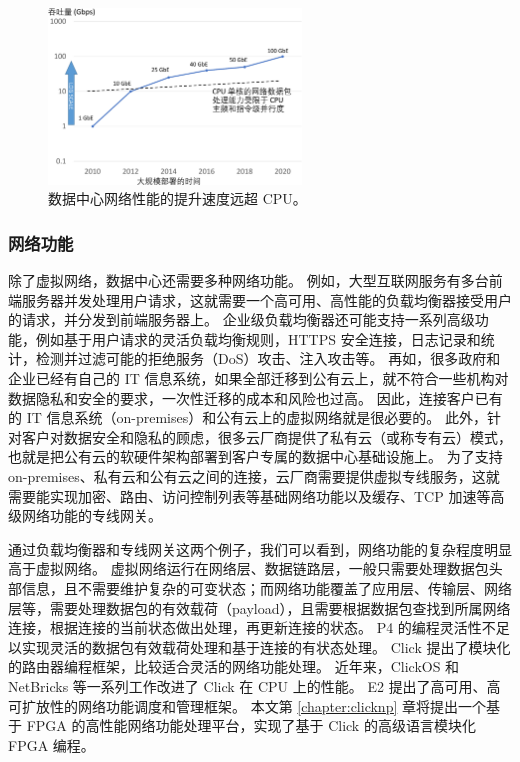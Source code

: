 \begin{figure}[htbp]
	\centering
	\includegraphics[width=0.6\textwidth]{figures/network_perf_trend.pdf}
	\caption{数据中心网络性能的提升速度远超 CPU。}
	\label{background:fig:network-perf-trend}
\end{figure}


\subsubsection{网络功能}

除了虚拟网络，数据中心还需要多种网络功能。
例如，大型互联网服务有多台前端服务器并发处理用户请求，这就需要一个高可用、高性能的负载均衡器接受用户的请求，并分发到前端服务器上。
企业级负载均衡器还可能支持一系列高级功能，例如基于用户请求的灵活负载均衡规则，HTTPS 安全连接，日志记录和统计，检测并过滤可能的拒绝服务（DoS）攻击、注入攻击等。
再如，很多政府和企业已经有自己的 IT 信息系统，如果全部迁移到公有云上，就不符合一些机构对数据隐私和安全的要求，一次性迁移的成本和风险也过高。
因此，连接客户已有的 IT 信息系统（on-premises）和公有云上的虚拟网络就是很必要的。
此外，针对客户对数据安全和隐私的顾虑，很多云厂商提供了私有云（或称专有云）模式，也就是把公有云的软硬件架构部署到客户专属的数据中心基础设施上。
为了支持 on-premises、私有云和公有云之间的连接，云厂商需要提供虚拟专线服务，这就需要能实现加密、路由、访问控制列表等基础网络功能以及缓存、TCP 加速等高级网络功能的专线网关。

通过负载均衡器和专线网关这两个例子，我们可以看到，网络功能的复杂程度明显高于虚拟网络。
虚拟网络运行在网络层、数据链路层，一般只需要处理数据包头部信息，且不需要维护复杂的可变状态；而网络功能覆盖了应用层、传输层、网络层等，需要处理数据包的有效载荷（payload），且需要根据数据包查找到所属网络连接，根据连接的当前状态做出处理，再更新连接的状态。
P4 \cite{bosshart2013forwarding} 的编程灵活性不足以实现灵活的数据包有效载荷处理和基于连接的有状态处理。
Click \cite{kohler2000click} 提出了模块化的路由器编程框架，比较适合灵活的网络功能处理。
近年来，ClickOS \cite{martins2014clickos} 和 NetBricks \cite{netbricks} 等一系列工作改进了 Click 在 CPU 上的性能。
E2 \cite{palkar2015e2} 提出了高可用、高可扩放性的网络功能调度和管理框架。
本文第 \ref{chapter:clicknp} 章将提出一个基于 FPGA 的高性能网络功能处理平台，实现了基于 Click 的高级语言模块化 FPGA 编程。







